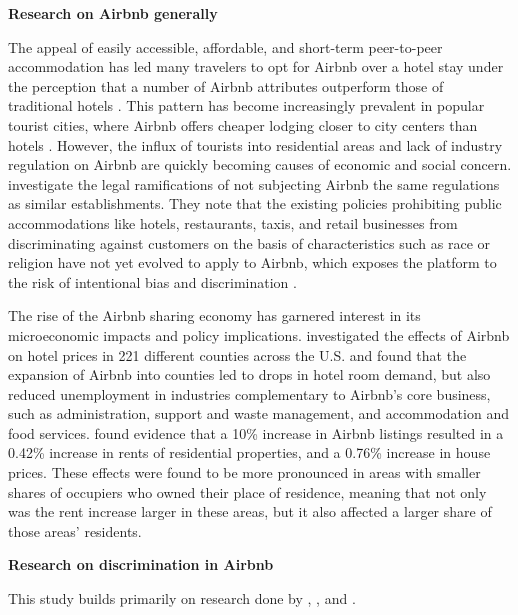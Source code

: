 \vspace{5mm}
\textbf{Research on Airbnb generally}

The appeal of easily accessible, affordable, and short-term peer-to-peer accommodation has led many travelers to opt for Airbnb over a hotel stay under the perception that a number of Airbnb attributes outperform those of traditional hotels \citep{guttentag}. This pattern has become increasingly prevalent in popular tourist cities, where Airbnb offers cheaper lodging closer to city centers than hotels \citep{gutierrez}. However, the influx of tourists into residential areas and lack of industry regulation on Airbnb are quickly becoming causes of economic and social concern. \cite{leong} investigate the legal ramifications of not subjecting Airbnb the same regulations as similar establishments. They note that the existing policies prohibiting public accommodations like hotels, restaurants, taxis, and retail businesses from discriminating against customers on the basis of characteristics such as race or religion have not yet evolved to apply to Airbnb, which exposes the platform to the risk of intentional bias and discrimination \citep{leong}. 

The rise of the Airbnb sharing economy has garnered interest in its microeconomic impacts and policy implications. \cite*{mao} investigated the effects of Airbnb on hotel prices in 221 different counties across the U.S. and found that the expansion of Airbnb into counties led to drops in hotel room demand, but also reduced unemployment in industries complementary to Airbnb’s core business, such as administration, support and waste management, and accommodation and food services. \cite*{barron} found evidence that a 10\% increase in Airbnb listings resulted in a 0.42\% increase in rents of residential properties, and a 0.76\% increase in house prices. These effects were found to be more pronounced in areas with smaller shares of occupiers who owned their place of residence, meaning that not only was the rent increase larger in these areas, but it also affected a larger share of those areas’ residents.



\vspace{5mm}
\textbf{Research on discrimination in Airbnb}

This study builds primarily on research done by \cite{edelman}, \cite{wang}, and \cite{kakar}. 

